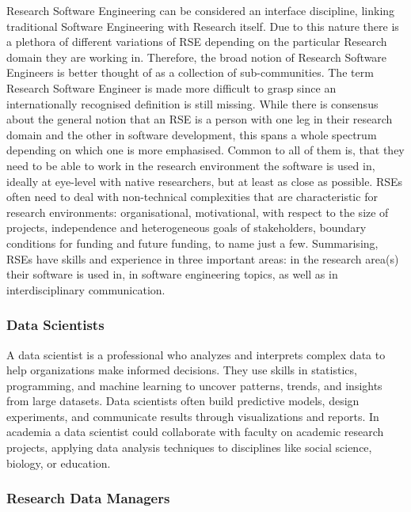 \documentclass[
        english,biblatex
    ]{lni}
\begin{document}
    Research Software Engineering can be considered an interface
    discipline, linking traditional Software Engineering with Research
    itself. Due to this nature there is a plethora of different
    variations of RSE depending on the particular Research domain they
    are working in. Therefore, the broad notion of Research Software
    Engineers is better thought of as a collection of sub-communities.
    The term Research Software Engineer is made more difficult to grasp
    since an internationally recognised definition is still missing.
    While there is consensus about the general notion that an RSE is a
    person with one leg in their research domain and the other in
    software development, this spans a whole spectrum depending on which
    one is more emphasised. Common to all of them is, that they need to
    be able to work in the research environment the software is used in,
    ideally at eye-level with native researchers, but at least as close
    as possible. RSEs often need to deal with non-technical complexities
    that are characteristic for research environments: organisational,
    motivational, with respect to the size of projects, independence and
    heterogeneous goals of stakeholders, boundary conditions for funding
    and future funding, to name just a few. Summarising, RSEs have
    skills and experience in three important areas: in the research
    area(s) their software is used in, in software engineering topics,
    as well as in interdisciplinary communication.

    \subsubsection{Data Scientists}\label{data-scientists}

    A data scientist is a professional who analyzes and interprets
    complex data to help organizations make informed decisions. They use
    skills in statistics, programming, and machine learning to uncover
    patterns, trends, and insights from large datasets. Data scientists
    often build predictive models, design experiments, and communicate
    results through visualizations and reports. In academia a data
    scientist could collaborate with faculty on academic research
    projects, applying data analysis techniques to disciplines like
    social science, biology, or education.

    \subsubsection{Research Data Managers}\label{research-data-managers}
\end{document}
